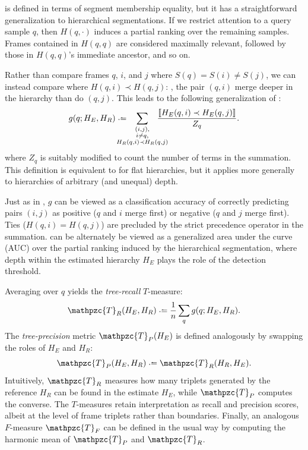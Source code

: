 \documentclass{article}
\def\shag{\ensuremath{\mathpzc{T}}}
\begin{document}
 is defined in terms of segment membership equality, but it has a straightforward 
generalization to hierarchical segmentations.
If we restrict attention to a query sample $q$, then $H(q, \cdot)$ induces a partial ranking over the remaining samples.
Frames contained in $H(q, q)$ are considered maximally relevant, followed by those in $H(q, q)$'s immediate ancestor, and so on.

Rather than compare frames $q$, $i$, and $j$ where ${S(q) = S(i) \neq S(j)}$, we can instead compare where
$H(q, i) \prec H(q, j)$: \ie, the pair $(q,i)$ merge deeper in the hierarchy than do $(q,j)$.
This leads to the following generalization of :
\begin{equation}
    g(q ; H_E, H_R) \defeq \hspace{-1.5em} \sum_{\substack{(i, j),\\ i \neq q,\\ H_R(q, i) \prec H_R(q, j)}}
    \hspace{-1.5em} \frac{\ind{H_E(q, i) \prec H_E(q, j)}}{Z_q}.\label{hierrecall}
\end{equation}
where $Z_q$ is suitably modified to count the number of terms in the summation.
This definition is equivalent to  for flat hierarchies, but it applies more generally to 
hierarchies of arbitrary (and unequal) depth.

Just as in , $g$ can be viewed as a classification accuracy of correctly predicting pairs $(i, j)$ as positive ($q$ and $i$ merge first) or negative ($q$ and $j$ merge first).
Ties ($H(q, i) = H(q, j)$) are precluded by the strict precedence operator in the summation.
 can be alternately be viewed as a generalized area under the curve (AUC) over the partial
ranking induced by the hierarchical segmentation, where depth within the estimated hierarchy $H_E$ plays the
role of the detection threshold.

Averaging over $q$ yields the \emph{tree-recall} $T$-measure:
\begin{equation}
\shag_R(H_E, H_R) \defeq \frac{1}{n} \sum_q g(q ; H_E, H_R).\label{shagunder}
\end{equation}
The \emph{tree-precision} metric $\shag_P(H_E)$ is defined analogously by swapping the roles of $H_E$ and $H_R$:
\begin{equation}
\shag_P(H_E, H_R) \defeq \shag_R(H_R, H_E).
\end{equation}
Intuitively, $\shag_R$ measures how many triplets generated by the reference $H_R$ can be found in the estimate $H_E$, 
while $\shag_P$ computes the converse.  The $T$-measures retain interpretation as recall and precision scores,
albeit at the level of frame triplets rather than boundaries.  Finally, an analogous $F$-measure $\shag_F$ can 
be defined in the usual way by computing the harmonic mean of $\shag_P$ and $\shag_R$.
\end{document}
